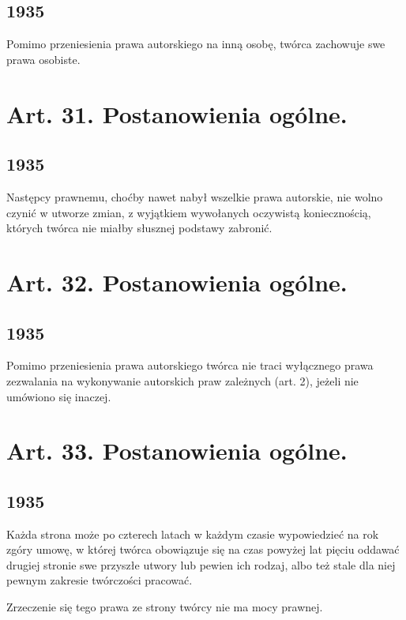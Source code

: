 \documentclass[withmarginpar]{book}
\begin{document}
\subsection{1935}
\label{sec:art.-30-1}

Pomimo przeniesienia prawa autorskiego na inną osobę, twórca zachowuje
swe prawa osobiste.

\section{Art. 31. Postanowienia ogólne.}
\label{sec:art.-31}
\subsection{1935}
\label{sec:art.-31-1}

Następcy prawnemu, choćby nawet nabył wszelkie prawa autorskie, nie
wolno czynić w utworze zmian, z wyjątkiem wywołanych oczywistą
koniecznością, których twórca nie miałby słusznej podstawy zabronić.

\section{Art. 32. Postanowienia ogólne.}
\label{sec:art.-32}
\subsection{1935}
\label{sec:art.-32-1}

Pomimo przeniesienia prawa autorskiego twórca nie traci wyłącznego
prawa zezwalania na wykonywanie autorskich praw zależnych (art. 2),
jeżeli nie umówiono się inaczej.

\section{Art. 33. Postanowienia ogólne.}
\label{sec:art.-33}
\subsection{1935}
\label{sec:art.-33-1}

Każda strona może po czterech latach w każdym czasie wypowiedzieć na
rok zgóry umowę, w której twórca obowiązuje się na czas powyżej lat
pięciu oddawać drugiej stronie swe przyszłe utwory lub pewien ich
rodzaj, albo też stale dla niej pewnym zakresie twórczości pracować.

Zrzeczenie się tego prawa ze strony twórcy nie ma mocy prawnej.
\end{document}
